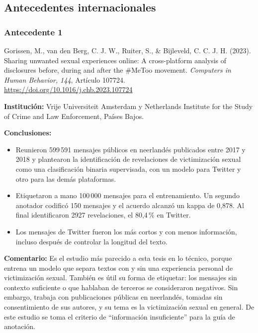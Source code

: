 \subsection{Antecedentes internacionales}

\subsubsection{Antecedente 1}
\noindent Gorissen, M., van den Berg, C. J. W., Ruiter, S., \& Bijleveld, C. C. J. H. (2023). Sharing unwanted sexual experiences online: A cross-platform analysis of disclosures before, during and after the \#MeToo movement. \textit{Computers in Human Behavior, 144}, Artículo 107724. \url{https://doi.org/10.1016/j.chb.2023.107724}

\noindent\textbf{Institución:} Vrije Universiteit Amsterdam y Netherlands Institute for the Study of Crime and Law Enforcement, Países Bajos.

\noindent\textbf{Conclusiones:}
\begin{itemize}
	\item Reunieron 599\,591 mensajes públicos en neerlandés publicados entre 2017 y 2018 y plantearon la identificación de revelaciones de victimización sexual como una clasificación binaria supervisada, con un modelo para Twitter y otro para las demás plataformas.
	\item Etiquetaron a mano 100\,000 mensajes para el entrenamiento. Un segundo anotador codificó 150 mensajes y el acuerdo alcanzó un kappa de 0,878. Al final identificaron 2927 revelaciones, el 80,4\,\% en Twitter.
	\item Los mensajes de Twitter fueron los más cortos y con menos información, incluso después de controlar la longitud del texto.
\end{itemize}

\noindent\textbf{Comentario:} Es el estudio más parecido a esta tesis en lo técnico, porque entrena un modelo que separa textos con y sin una experiencia personal de victimización sexual. También es útil su forma de etiquetar: los mensajes sin contexto suficiente o que hablaban de terceros se consideraron negativos. Sin embargo, trabaja con publicaciones públicas en neerlandés, tomadas sin consentimiento de sus autores, y su tema es la victimización sexual en general. De este estudio se toma el criterio de \enquote{información insuficiente} para la guía de anotación.

